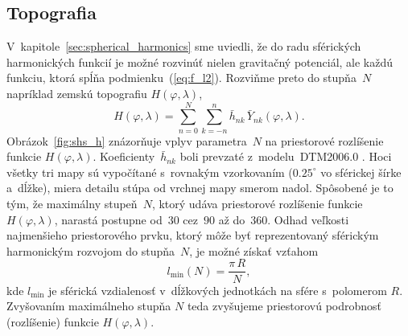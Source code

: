 \documentclass[a4paper, 12pt]{book}
\begin{document}
\subsection{Topografia}
\label{sec:sh_applications_topography}

V~kapitole~\ref{sec:spherical_harmonics} sme uviedli, že do radu sférických
harmonických funkcií je možné rozvinúť nielen gravitačný potenciál, ale každú
funkciu, ktorá spĺňa podmienku~(\ref{eq:f_l2}).  Rozviňme preto do stupňa~$N$ 
napríklad zemskú topografiu $H(\varphi, \lambda)$,
%
\begin{equation}
\label{eq:h_shs}
H(\varphi, \lambda) = \sum_{n = 0}^{N} \sum_{k = -n}^n \bar{h}_{nk} \,
\bar{Y}_{nk}(\varphi, \lambda){.}
\end{equation}
%
Obrázok~\ref{fig:shs_h} znázorňuje vplyv parametra~$N$ na priestorové 
rozlíšenie funkcie $H(\varphi, \lambda)$.  Koeficienty~$\bar{h}_{nk}$ boli 
prevzaté z~modelu~DTM2006.0 \parencite{DTM2006}.  Hoci všetky tri mapy sú 
vypočítané s~rovnakým vzorkovaním ($0.25^{\circ}$ vo sférickej šírke a~dĺžke), 
miera detailu stúpa od vrchnej mapy smerom nadol.  Spôsobené je to tým, že 
maximálny stupeň~$N$, ktorý udáva priestorové rozlíšenie funkcie 
$H(\varphi,\lambda)$, narastá postupne od~$30$ cez~$90$ až do~$360$.  Odhad 
veľkosti najmenšieho priestorového prvku, ktorý môže byť reprezentovaný 
sférickým harmonickým rozvojom do stupňa~$N$, je možné získať vzťahom 
\parencite{Barthelmes2013}
%
\begin{equation}
l_{\min}(N) = \frac{\pi \, R}{N}{,}
\end{equation}
%
kde $l_{\min}$ je sférická vzdialenosť v~dĺžkových jednotkách na sfére 
s~polomerom $R$.  Zvyšovaním maximálneho stupňa $N$ teda zvyšujeme priestorovú 
podrobnosť (rozlíšenie) funkcie $H(\varphi, \lambda)$.
\end{document}
